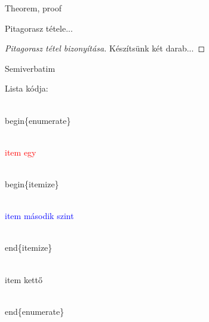 \documentclass[aspectratio=169, xcolor=table]{beamer}
\begin{document}
    \begin{frame}{Theorem, proof}
        \begin{theorem}
            Pitagorasz tétele...
        \end{theorem}
        
        \begin{proof}[Pitagorasz tétel bizonyítása]
            Készítsünk két darab... \qedhere
        \end{proof}
    \end{frame}
    
    \begin{frame}{Semiverbatim}
        \begin{semiverbatim}
            Lista kódja:
            
                \\begin\{enumerate\}
                
                    \textcolor{red}{\\item egy}
                    
                    \\begin\{itemize\}
                    
                        \textcolor{blue}{\\item második szint}
                        
                    \\end\{itemize\}
                    
                    \\item kettő
                    
                \\end\{enumerate\}
        \end{semiverbatim}
    \end{frame}
    
\end{document}

